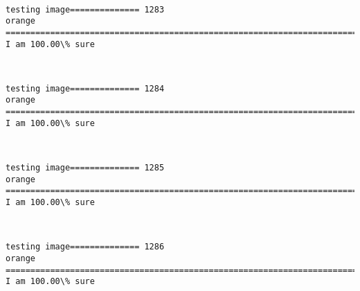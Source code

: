 \documentclass[11pt]{article}
\begin{document}
    \begin{center}
    \end{center}
    { \hspace*{\fill} \\}
    
    \begin{Verbatim}[commandchars=\\\{\}]
testing image============== 1283
orange
============================================================================
I am 100.00\% sure

    \end{Verbatim}

    \begin{center}
    \end{center}
    { \hspace*{\fill} \\}
    
    \begin{Verbatim}[commandchars=\\\{\}]
testing image============== 1284
orange
============================================================================
I am 100.00\% sure

    \end{Verbatim}

    \begin{center}
    \end{center}
    { \hspace*{\fill} \\}
    
    \begin{Verbatim}[commandchars=\\\{\}]
testing image============== 1285
orange
============================================================================
I am 100.00\% sure

    \end{Verbatim}

    \begin{center}
    \end{center}
    { \hspace*{\fill} \\}
    
    \begin{Verbatim}[commandchars=\\\{\}]
testing image============== 1286
orange
============================================================================
I am 100.00\% sure

    \end{Verbatim}
\end{document}
